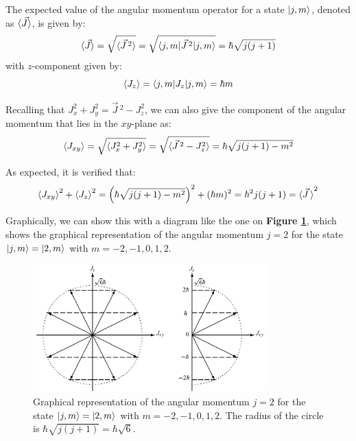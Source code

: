 The expected value of the angular momentum operator for a state $\ket{j,m}$, denoted as $\braket{\vec{J}}$, is given by:
\begin{equation}
    \braket{\vec{J}} = \sqrt{\braket{\vec{J}\,^2}} = \sqrt{\braket{j,m|\vec{J}\,^2|j,m}} = \hbar\sqrt{j(j+1)}
\end{equation}
with $z$-component given by: 
\begin{equation}
    \braket{J_z} = \braket{j,m|J_z|j,m} = \hbar m
\end{equation}

Recalling that $J_x^2 + J_y^2 = \vec{J}\,^2 - J_z^2$, we can also give the component of the angular momentum that lies in the $xy$-plane as:
\begin{equation}
    \braket{J_{xy}} = \sqrt{\braket{J_x^2 + J_y^2}} = \sqrt{\braket{\vec{J}\,^2 - J_z^2}} = \hbar\sqrt{j(j+1) - m^2}
\end{equation}

As expected, it is verified that:
\begin{equation}
    \braket{J_{xy}}^2 + \braket{J_z}^2 = \left(\hbar \sqrt{j(j+1)-m^2}\right)^2+(\hbar m)^2 = \hbar^2j(j+1) = \braket{\vec{J}\,}^2
\end{equation}   

Graphically, we can show this with a diagram like the one on \textbf{Figure \ref{fig:angular_momentum_diagram}}, which shows the graphical representation of the angular momentum $j=2$ for the state $\ket{j,m} = \ket{2,m}$ with $m = -2, -1, 0, 1, 2$. 

\begin{figure}[htbp]
    \centering
    \includegraphics[width=0.8\textwidth]{images/graphical_angular_momentum.png}
    \caption{Graphical representation of the angular momentum $j = 2$ for the state $\ket{j,m} = \ket{2,m}$ with $m = -2, -1, 0, 1, 2$. The radius of the circle is $\hbar\sqrt{j(j+1)} = \hbar \sqrt{6}$.}
    \label{fig:angular_momentum_diagram}
\end{figure}

